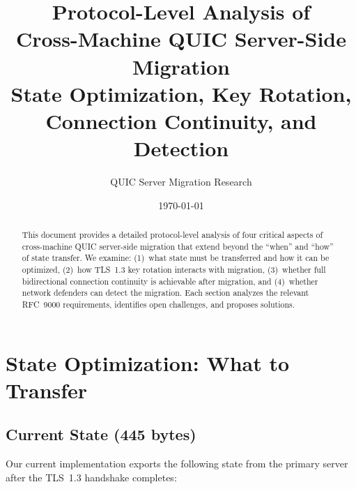 \documentclass[11pt,a4paper]{article}
\title{
    \vspace{-1cm}
    \textbf{Protocol-Level Analysis of\\Cross-Machine QUIC Server-Side Migration}\\[0.5cm]
    \large State Optimization, Key Rotation, Connection Continuity, and Detection
}
\author{QUIC Server Migration Research}
\date{\today}
\begin{document}
\maketitle

\begin{abstract}
This document provides a detailed protocol-level analysis of four critical aspects of cross-machine QUIC server-side migration that extend beyond the ``when'' and ``how'' of state transfer. We examine: (1)~what state must be transferred and how it can be optimized, (2)~how TLS~1.3 key rotation interacts with migration, (3)~whether full bidirectional connection continuity is achievable after migration, and (4)~whether network defenders can detect the migration. Each section analyzes the relevant RFC~9000 requirements, identifies open challenges, and proposes solutions.
\end{abstract}

\tableofcontents
\newpage

\section{State Optimization: What to Transfer}

\subsection{Current State (445 bytes)}

Our current implementation exports the following state from the primary server after the TLS~1.3 handshake completes:
\end{document}
